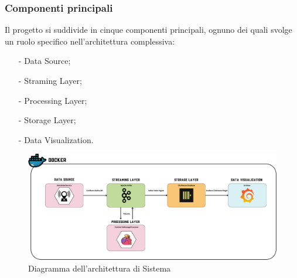 \documentclass[10pt]{article}
\begin{document}
\subsubsection{Componenti principali}
Il progetto si suddivide in cinque componenti principali, ognuno dei quali svolge un ruolo specifico nell'architettura complessiva:
\begin{itemize}
    \item[-] Data Source;
    \item[-] Straming Layer;
    \item[-] Processing Layer;
    \item[-] Storage Layer;
    \item[-] Data Visualization.
\end{itemize}

\begin{figure}[H]
    \centering
    \includegraphics[width=\textwidth]{SystemArchitecture.pdf}
    \caption{Diagramma dell'architettura di Sistema}
\end{figure}
\end{document}
